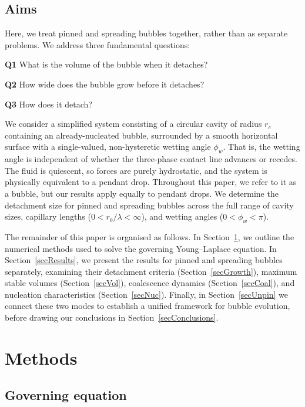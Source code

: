 \documentclass[9pt]{extarticle}
\begin{document}
\subsection{Aims}

Here, we treat pinned and spreading bubbles together, rather than as separate problems. We address three fundamental questions: 

\textbf{Q1} What is the volume of the bubble when it detaches?

\textbf{Q2} How wide does the bubble grow before it detaches?

\textbf{Q3} How does it detach?

We consider a simplified system consisting of a circular cavity of radius $r_c$ containing an already-nucleated bubble, surrounded by a smooth horizontal surface with a single-valued, non-hysteretic wetting angle $\phi_w$. That is, the wetting angle is independent of whether the three-phase contact line advances or recedes. The fluid is quiescent, so forces are purely hydrostatic, and the system is physically equivalent to a pendant drop. Throughout this paper, we refer to it as a bubble, but our results apply equally to pendant drops. We determine the detachment size for pinned and spreading bubbles across the full range of cavity sizes, capillary lengths ($0< r_0/\lambda<\infty$), and wetting angles ($0<\phi_w<\pi$).

The remainder of this paper is organised as follows. In Section~\ref{secMethods}, we outline the numerical methods used to solve the governing Young--Laplace equation. In Section~\ref{secResults}, we present the results for pinned and spreading bubbles separately, examining their detachment criteria (Section~\ref{secGrowth}), maximum stable volumes (Section~\ref{secVol}), coalescence dynamics (Section~\ref{secCoal}), and nucleation characteristics (Section~\ref{secNuc}). Finally, in Section~\ref{secUnpin} we connect these two modes to establish a unified framework for bubble evolution, before drawing our conclusions in Section~\ref{secConclusions}.
\section{Methods}\label{secMethods}

\subsection{Governing equation}
\end{document}
